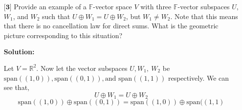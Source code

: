 \documentclass[12pt]{article}
\newcommand      {\Rm}         {{\mathbb R}}
\newcommand      {\Fm}          {{\mathbb F}}
\begin{document}
\begin{itemize}
\begin{itemize}
    \vspace{.3cm}
    \item[(a)]
    Prove that there exists a non-zero vector $x \in V$ such that $[x,y_j] = 0$ for $1 \leq j \leq m$. What does this result say about the solutions of linear equations?
    \begin{proof}
        We can prove this using the rank-nullity theorem from linear algebra. To apply it we will first define the map
        \begin{align*}
            \phi: V &\to \Fm^m \\
            x &\mapsto (y_1(x), \dots, y_m(x))
        \end{align*}

        We are given that the dimension of $V$ is $n$, we know from class that the dimension of $\Fm^m$ is simply $m$. We also know that $m < n$, recall the rank-nullity theorem \[\text{dim}(V) = \text{dim}(\Fm^m)+\text{dim}(\ker(\phi))\] thus by the rank nullity theorem we know that the kernal of $\phi$ is non trivial. Therefore there exists a non-zero vector $x\in V$ such that $[x,y_j] = 0$ for $1\leq j \leq m$
    \end{proof}
    
    \vspace{.3cm}
    \item[(b)]
    Under what conditions on the scalars $\alpha_1,\dots,\alpha_m \in \mathbb{F}$ is it true that there exists a vector $x \in V$ such that $[x,y_j] = \alpha_j$ for $1 \leq j \leq m$? What does this result say about the solutions of linear equations?
    
    \end{itemize}
    
    \vspace{.5cm}
    \item[$\textbf{[3]}$]
    Provide an example of a $\mathbb{F}$-vector space $V$ with three $\mathbb{F}$-vector subspaces $U$, $W_1$, and $W_2$ such that $U \oplus W_1 = U \oplus W_2$, but $W_1 \neq W_2$. Note that this means that there is no cancellation law for direct sums. What is the geometric picture corresponding to this situation?
    
    \textbf{Solution:}
    
        Let $V = \Rm^2$. Now let the vector subspaces $U,W_1,\ W_2$ be $\text{span}((1,0)), \text{span}((0,1)), \text{and }\text{span}((1,1))$ respectively. We can see that, 
        \[U \oplus W_1 = U \oplus W_2\]
        \[\text{span}((1,0))\oplus \text{span}((0,1)) = \text{span}((1,0))\oplus\text{span}((1,1)\]


\end{itemize}
\end{document}
